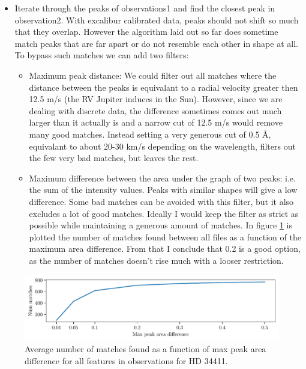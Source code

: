     \begin{itemize}
        \item Iterate through the peaks of observations1 and find the closest peak in observation2. With excalibur calibrated data, peaks should not shift so much that they overlap. However the algorithm laid out so far does sometime match peaks that are far apart or do not resemble each other in shape at all. To bypass such matches we can add two filters:
        \begin{itemize}
            \item Maximum peak distance: We could filter out all matches where the distance between the peaks is equivalant to a radial velocity greater then 12.5 m/s (the RV Jupiter induces in the Sun). However, since we are dealing with discrete data, the difference sometimes comes out much larger than it actually is and a narrow cut of 12.5 m/s would remove many good matches. Instead setting a very generous cut of 0.5 Å, equivalant to about 20-30 km/s depending on the wavelength, filters out the few very bad matches, but leaves the rest.
            
            \item Maximum difference between the area under the graph of two peaks: i.e. the sum of the intensity values. Peaks with similar shapes will give a low difference. Some bad matches can be avoided with this filter, but it also excludes a lot of good matches. Ideally I would keep the filter as strict as possible while maintaining a generous amount of matches. In figure \ref{fig:max_area_diff_vs_n_matches} is plotted the number of matches found between all files as a function of the maximum area difference. From that I conclude that 0.2 is a good option, as the number of matches doesn't rise much with a looser restriction.
        \end{itemize}
    \end{itemize}

    \begin{figure}%
        \begin{wide}  
            \includegraphics[width=\textwidth]{figures/max_peak_area_diff_vs_Nmatches.pdf}
            \caption{Average number of matches found as a function of max peak area difference for all features in observations for HD 34411.}
            \label{fig:max_area_diff_vs_n_matches}
        \end{wide}
    \end{figure}

